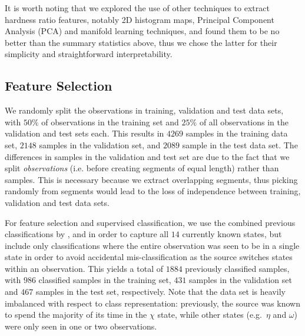 \documentclass[12pt]{emulateapj}
\begin{document}
It is worth noting that we explored the use of other techniques to extract hardness ratio features, notably 2D histogram maps, Principal Component Analysis (PCA) and manifold learning techniques, and found them to be no better than the summary statistics above, thus we chose the latter for their simplicity and straightforward interpretability. 


\subsection{Feature Selection}
\label{sec:featureselection}

We randomly split the observations in training, validation and test data sets, with $50\%$ of observations in the training set and $25\%$ of all observations in the validation and test sets each. This results in $4269$ samples in the training data set, $2148$ samples in the validation set, and $2089$ sample in the test data set.  The differences in samples in the validation and test set are due to the fact that we split \textit{observations} (i.e. before creating segments of equal length) rather than samples. This is necessary because we extract overlapping segments, thus picking randomly from segments would lead to the loss of independence between training, validation and test data sets. 

For feature selection and supervised classification, we use the combined previous classifications by \citet{belloni2000}, \citet{kleinwolt2002} and \citet{hannikainen2003} in order to capture all $14$ currently known states, but include only classifications where the entire observation was seen to be in a single state in order to avoid accidental mis-classification as the source switches states within an observation. This yields a total of $1884$ previously classified samples, with $986$ classified samples in the training set, $431$ samples in the validation set and $467$ samples in the test set, respectively. Note that the data set is heavily imbalanced with respect to class representation: previously, the source was known to spend the majority of its time in the $\chi$ state, while other states (e.g.\ $\eta$ and $\omega$) were only seen in one or two observations. 
\end{document}
